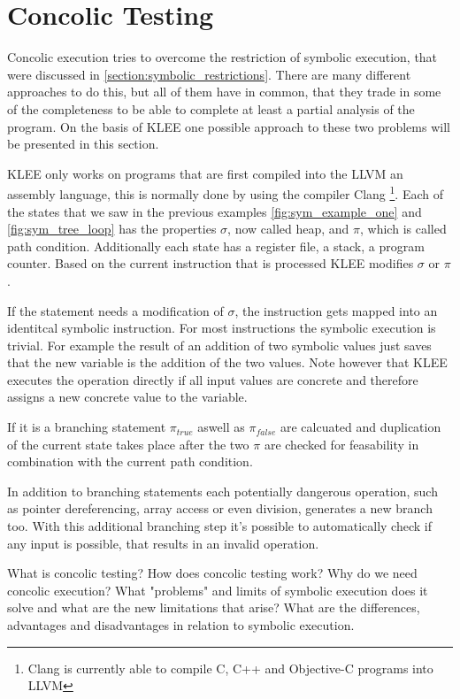 \section{Concolic Testing} \label{section:concolic_testing}
Concolic execution tries to overcome the restriction of symbolic execution, that were discussed in \ref{section:symbolic_restrictions}. There are many different approaches to do this, but all of them have in common, that they trade in some of the completeness to be able to complete at least a partial analysis of the program.
On the basis of KLEE \cite{Cadar:2008:KUA:1855741.1855756} one possible approach to these two problems will be presented in this section.

KLEE only works on programs that are first compiled into the LLVM an assembly language, this is normally done by using the compiler Clang \footnote{Clang is currently able to compile C, C++  and Objective-C programs into LLVM}. 
Each of the states that we saw in the previous examples \ref{fig:sym_example_one} and \ref{fig:sym_tree_loop} has the properties $\sigma$, now called heap, and $\pi$, which is called path condition. Additionally each state has a register file, a stack, a program counter. Based on the current instruction that is processed KLEE modifies $\sigma$ or $\pi$.

If the statement needs a modification of $\sigma$, the instruction gets mapped into an identitcal symbolic instruction. For most instructions the symbolic execution is trivial. For example the result of an addition of two symbolic values just saves that the new variable is the addition of the two values. Note however that KLEE executes the operation directly if all input values are concrete and therefore assigns a new concrete value to the variable.

If it is a branching statement $\pi_{true}$ aswell as $\pi_{false}$ are calcuated and duplication of the current state takes place after the two $\pi$ are checked for feasability in combination with the current path condition.

In addition to branching statements each potentially dangerous operation, such as pointer dereferencing, array access or even division, generates a new branch too. With this additional branching step it's possible to automatically check if any input is possible, that results in an invalid operation.

What is concolic testing? How does concolic testing work? Why do we need concolic execution? What "problems" and limits of symbolic execution does it solve and what are the new limitations that arise?
What are the differences, advantages and disadvantages in relation to symbolic execution.
\cite{Cadar:2006:EAG:1180405.1180445}
\cite{Cadar:2008:KUA:1855741.1855756}
\cite{Cadar:2013:SES:2408776.2408795}
\cite{Godefroid:2005:DDA:1064978.1065036}
\cite{Godefroid:2012:SWF:2090147.2094081}